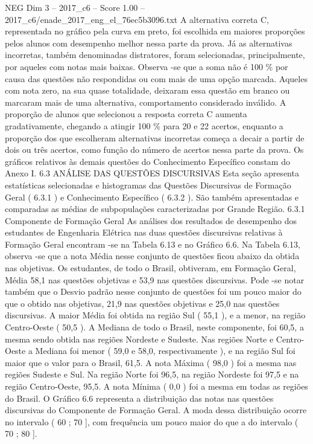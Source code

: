 \begin{textsample}{NEG Dim 3 – 2017\_c6 – Score 1.00 – 2017\_c6/enade\_2017\_eng\_el\_76ec5b3096.txt}
A alternativa correta C, representada no gráfico pela curva em preto, foi escolhida em maiores proporções pelos alunos com desempenho melhor nessa parte da prova.
Já as alternativas incorretas, também denominadas distratores, foram selecionadas, principalmente, por aqueles com notas mais baixas.
Observa -se que a soma não é 100 \% por causa das questões não respondidas ou com mais de uma opção marcada.
Aqueles com nota zero, na sua quase totalidade, deixaram essa questão em branco ou marcaram mais de uma alternativa, comportamento considerado inválido.
A proporção de alunos que selecionou a resposta correta C aumenta gradativamente, chegando a atingir 100 \% para 20 e 22 acertos, enquanto a proporção dos que escolheram alternativas incorretas começa a decair a partir de dois ou três acertos, como função do número de acertos nessa parte da prova.
Os gráficos relativos às demais questões do Conhecimento Específico constam do Anexo I. 6.3 ANÁLISE DAS QUESTÕES DISCURSIVAS Esta seção apresenta estatísticas selecionadas e histogramas das Questões Discursivas de Formação Geral ( 6.3.1 ) e Conhecimento Específico ( 6.3.2 ).
São também apresentadas e comparadas as médias de subpopulações caracterizadas por Grande Região. 6.3.1 Componente de Formação Geral As análises dos resultados de desempenho dos estudantes de Engenharia Elétrica nas duas questões discursivas relativas à Formação Geral encontram -se na Tabela 6.13 e no Gráfico 6.6.
Na Tabela 6.13, observa -se que a nota Média nesse conjunto de questões ficou abaixo da obtida nas objetivas.
Os estudantes, de todo o Brasil, obtiveram, em Formação Geral, Média 58,1 nas questões objetivas e 53,9 nas questões discursivas.
Pode -se notar também que o Desvio padrão nesse conjunto de questões foi um pouco maior do que o obtido nas objetivas, 21,9 nas questões objetivas e 25,0 nas questões discursivas.
A maior Média foi obtida na região Sul ( 55,1 ), e a menor, na região Centro-Oeste ( 50,5 ).
A Mediana de todo o Brasil, neste componente, foi 60,5, a mesma sendo obtida nas regiões Nordeste e Sudeste.
Nas regiões Norte e Centro-Oeste a Mediana foi menor ( 59,0 e 58,0, respectivamente ), e na região Sul foi maior que o valor para o Brasil, 61,5.
A nota Máxima ( 98,0 ) foi a mesma nas regiões Sudeste e Sul.
Na região Norte foi 96,5, na região Nordeste foi 97,5 e na região Centro-Oeste, 95,5.
A nota Mínima ( 0,0 ) foi a mesma em todas as regiões do Brasil.
O Gráfico 6.6 representa a distribuição das notas nas questões discursivas do Componente de Formação Geral.
A moda dessa distribuição ocorre no intervalo ( 60 ; 70 ], com frequência um pouco maior do que a do intervalo ( 70 ; 80 ].

\end{textsample}
